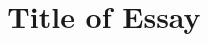 \documentclass[notitlepage]{article}
\title{Title of Essay}
\author{}
\date{}
\begin{document}
\maketitle
\begin{footnotesize}
\begin{center}

\end{center}
\end{footnotesize}
\end{document}
